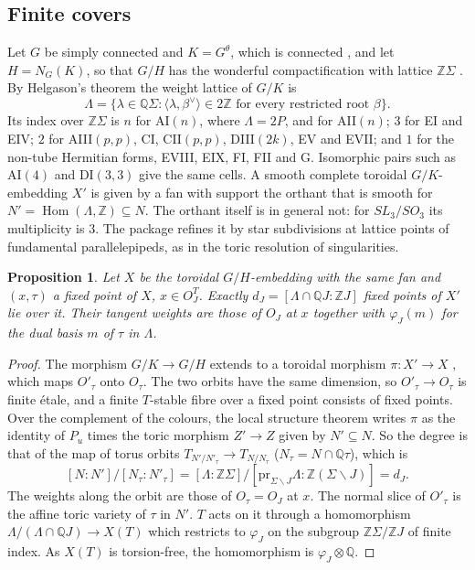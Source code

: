 \documentclass[11pt]{amsart}
\newtheorem{proposition}[theorem]{Proposition}
\theoremstyle{definition}
\theoremstyle{remark}
\newcommand{\QQ}{\mathbb{Q}}
\newcommand{\ZZ}{\mathbb{Z}}
\newcommand{\pr}{\mathrm{pr}}
\begin{document}
\subsection{Finite covers}\label{subsec:covers}
Let $G$ be simply connected and $K=G^\theta$, which is connected
\cite[Thm.~8.1]{Steinberg68}, and let $H=N_G(K)$, so that $G/H$ has the
wonderful compactification with lattice $\ZZ\Sigma$ \cite{DCP83}. By
Helgason's theorem \cite[Ch.~V, Thm.~4.1]{Helgason} the weight lattice of
$G/K$ is
\[
\Lambda=\{\lambda\in\QQ\Sigma : \langle\lambda,\beta^\vee\rangle\in2\ZZ
\text{ for every restricted root }\beta\}.
\]
Its index over $\ZZ\Sigma$ is $n$ for AI$(n)$, where $\Lambda=2P$, and for
AII$(n)$; $3$ for EI and EIV; $2$ for AIII$(p,p)$, CI, CII$(p,p)$, DIII$(2k)$,
EV and EVII; and $1$ for the non-tube Hermitian forms, EVIII, EIX, FI, FII
and G. Isomorphic pairs such as AI$(4)$ and DI$(3,3)$ give the same cells. A
smooth complete toroidal $G/K$-embedding $X'$ is given by a fan with support
the orthant that is smooth for $N'=\operatorname{Hom}(\Lambda,\ZZ)\subseteq N$. The
orthant itself is in general not: for $SL_3/SO_3$ its multiplicity is $3$. The
package refines it by star subdivisions at lattice points of fundamental
parallelepipeds, as in the toric resolution of singularities.

\begin{proposition}\label{prop:covers}
Let $X$ be the toroidal $G/H$-embedding with the same fan and $(x,\tau)$ a
fixed point of $X$, $x\in O_J^T$. Exactly $d_J=[\Lambda\cap\QQ J:\ZZ J]$
fixed points of $X'$ lie over it. Their tangent weights are those of $O_J$ at
$x$ together with $\varphi_J(m)$ for the dual basis $m$ of $\tau$ in $\Lambda$.
\end{proposition}

\begin{proof}
The morphism $G/K\to G/H$ extends to a toroidal morphism $\pi\colon X'\to X$
\cite{Knop91}, which maps $O'_\tau$ onto $O_\tau$. The two orbits have the
same dimension, so $O'_\tau\to O_\tau$ is finite \'etale, and a finite
$T$-stable fibre over a fixed point consists of fixed points. Over the
complement of the colours, the local structure theorem writes $\pi$ as the
identity of $P_u$ times the toric morphism $Z'\to Z$ given by
$N'\subseteq N$. So the degree is that of the map of torus orbits
$T_{N'/N'_\tau}\to T_{N/N_\tau}$ ($N_\tau=N\cap\QQ\tau$), which is
\[
[N:N']/[N_\tau:N'_\tau]
=[\Lambda:\ZZ\Sigma]/[\pr_{\Sigma\smallsetminus J}\Lambda:\ZZ(\Sigma\smallsetminus J)]
=d_J .
\]
The weights along the orbit are those of $O_\tau=O_J$ at $x$. The normal slice
of $O'_\tau$ is the affine toric variety of $\tau$ in $N'$. $T$ acts on it
through a homomorphism $\Lambda/(\Lambda\cap\QQ J)\to X(T)$ which restricts
to $\varphi_J$ on the subgroup $\ZZ\Sigma/\ZZ J$ of finite index. As $X(T)$ is
torsion-free, the homomorphism is $\varphi_J\otimes\QQ$.
\end{proof}
\end{document}
